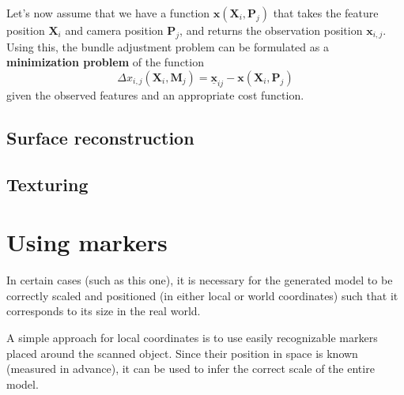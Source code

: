Let's now assume that we have a function $\bm{x}(\mathbf{X}_i, \mathbf{P}_j)$ that takes the feature position $\mathbf{X}_i$ and camera position $\mathbf{P}_j$, and returns the observation position $\mathbf{x}_{i, j}$.
Using this, the bundle adjustment problem can be formulated as a \textbf{minimization problem} of the function $$\Delta x_{i, j} (\mathbf{X}_i, \mathbf{M}_j) = \underline{\bm{x}}_{ij} - \bm{x}(\mathbf{X}_i, \mathbf{P}_j)$$
given the observed features and an appropriate cost function.



\subsection{Surface reconstruction}

\subsection{Texturing}

\section{Using markers}
In certain cases (such as this one), it is necessary for the generated model to be correctly scaled and positioned (in either local or world coordinates) such that it corresponds to its size in the real world.

A simple approach for local coordinates is to use easily recognizable markers placed around the scanned object.
Since their position in space is known (measured in advance), it can be used to infer the correct scale of the entire model.

